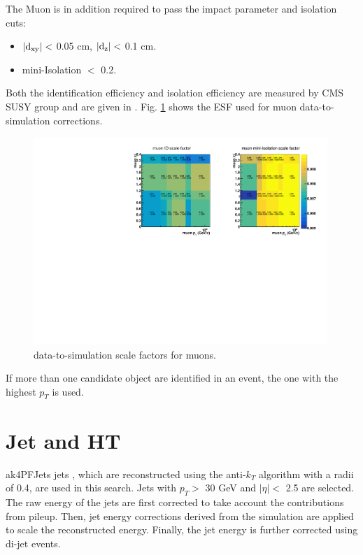\documentclass[thesis.tex]{subfiles}
\renewcommand\_{\textunderscore\allowbreak}
\begin{document}
The Muon is in addition required to pass the impact parameter and isolation cuts:
\begin{center}
\begin{itemize}
\item $\mathrm{|d_{xy}|} <$ 0.05 cm, $\mathrm{|d_{z}|} <$ 0.1 cm.
\item mini-Isolation $<$ 0.2.
\end{itemize}
\end{center}

Both the identification efficiency and isolation efficiency are measured by CMS SUSY group and are given in \cite{EGM:leptonScale}. Fig. \ref{fig:muonsf} shows the ESF used for muon data-to-simulation corrections.

\begin{figure}[hbtp]
	\centering
	\includegraphics[width=0.99\textwidth]{plot/SF_Muon.pdf}
	\caption{data-to-simulation scale factors for muons.}
	\label{fig:muonsf}
\end{figure}

If more than one candidate object are identified in an event, the one with the highest $p_{T}$ is used.

\section{Jet and HT}
\label{subsec:jetID}
ak4PFJets jets \cite{CMS:AK4Jet1,CMS:AK4Jet2}, which are reconstructed using the anti-$k_T$ algorithm with a radii of 0.4, are used in this search.
Jets with $p_T >$ 30 GeV and $|\eta| <$ 2.5 are selected. 
The raw energy of the jets are first corrected to take account the contributions from pileup.
Then, jet energy corrections \cite{CMS:JES} derived from the simulation are applied to scale the reconstructed energy.
Finally, the jet energy is further corrected using di-jet events. 
\end{document}

